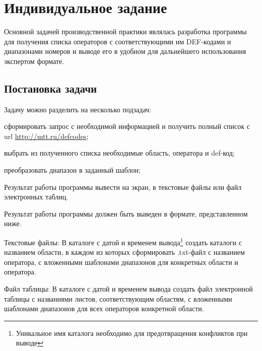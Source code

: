 \section{Индивидуальное задание}

Основной задачей производственной практики являлась разработка программы для получения списка операторов с соответствующими им DEF-кодами и диапазонами номеров и выводе его в удобном для дальнейшего использования экспертом формате.

\subsection{Постановка задачи}

Задачу можно разделить на несколько подзадач:

\begin{enumerate*}
	\item сформировать запрос с необходимой информацией и получить полный список с url \url{http://mtt.ru/defcodes};
	\item выбрать из полученного списка необходимые область, оператора и def-код;
	\item преобразовать диапазон в заданный шаблон;
	\item Результат работы программы вывести на экран, в текстовые файлы или файл электронных таблиц.
\end{enumerate*}

Результат работы программы должен быть выведен в формате, представленном ниже.

\begin{itemize*}
	\item Текстовые файлы:
		В каталоге с датой и временем вывода\footnote{Уникальное имя каталога необходимо для предотвращения конфликтов при выводе} создать каталоги с названием области, в каждом из которых сформировать .txt-файл с названием оператора, с вложенными шаблонами диапазонов для конкретных области и оператора.

	\item Файл таблицы:
		В каталоге с датой и временем вывода создать файл электронной таблицы с названиями листов, соответствующим областям, с вложенными шаблонами диапазонов для всех операторов конкретной области.

\end{itemize*}

